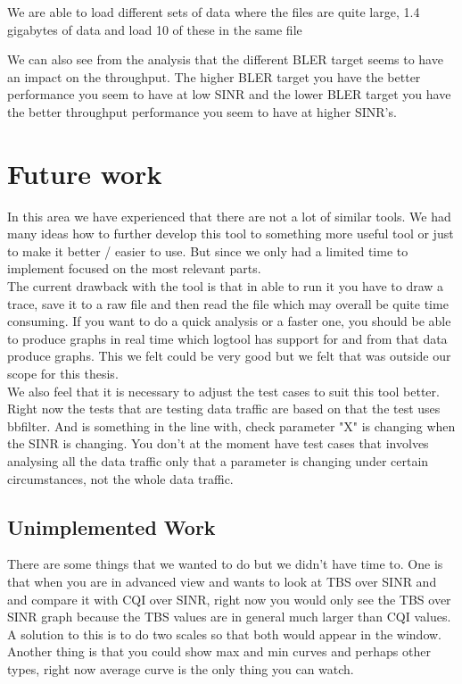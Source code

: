 \documentclass[cropmarks, frame, english]{idamasterthesis}
\begin{document}
We are able to load different sets of data where the files are quite large, 1.4 gigabytes of data and load 10 of these in the same file

We can also see from the analysis that the different BLER target seems to have an impact on the throughput. The higher BLER target you have the better performance you seem to have at low SINR and the lower BLER target you have the better throughput performance you seem to have at higher SINR's.














\chapter{Future work}
In this area we have experienced that there are not a lot of similar tools. We had many ideas how to further develop this tool to something more useful tool or just to make it better / easier to use. But since we only had a limited time to implement focused on the most relevant parts.\\

The current drawback with the tool is that in able to run it you have to draw a trace, save it to a raw file and then read the file which may overall be quite time consuming. If you want to do a quick analysis or a faster one, you should be able to produce graphs in real time which logtool has support for and from that data produce graphs. This we felt could be very good but we felt that was outside our scope for this thesis. \\

We also feel that it is necessary to adjust the test cases to suit this tool better. Right now the tests that are testing data traffic are based on that the test uses bbfilter. And is something in the line with, check parameter "X" is changing when the SINR is changing. You don't at the moment have test cases that involves analysing all the data traffic only that a parameter is changing under certain circumstances, not the whole data traffic. \\

\section{Unimplemented Work}
There are some things that we wanted to do but we didn't have time to. One is that when you are in advanced view and wants to look at TBS over SINR and and compare it with CQI over SINR, right now you would only see the TBS over SINR graph because the TBS values are in general much larger than CQI values. A solution to this is to do two scales so that both would appear in the window. \\
Another thing is that you could show max and min curves and perhaps other types, right now average curve is the only thing you can watch.
\end{document}
